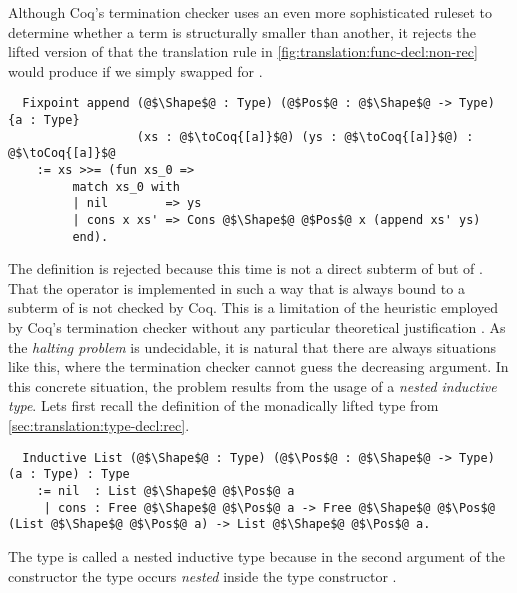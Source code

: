 Although Coq's termination checker uses an even more sophisticated ruleset to determine whether a term is structurally smaller than another, it rejects the lifted version of  that the translation rule in \autoref{fig:translation:func-decl:non-rec} would produce if we simply swapped  for .
\begin{verbatim}
  Fixpoint append (@$\Shape$@ : Type) (@$Pos$@ : @$\Shape$@ -> Type) {a : Type}
                  (xs : @$\toCoq{[a]}$@) (ys : @$\toCoq{[a]}$@) : @$\toCoq{[a]}$@
    := xs >>= (fun xs_0 =>
         match xs_0 with
         | nil        => ys
         | cons x xs' => Cons @$\Shape$@ @$Pos$@ x (append xs' ys)
         end).
\end{verbatim}
The definition is rejected because this time  is not a direct subterm of  but of .
That the \coq{>>=} operator is implemented in such a way that  is always bound to a subterm of  is not checked by Coq.
This is a limitation of the heuristic employed by Coq's termination checker without any particular theoretical justification \cite[p.~62]{Chlipala:2013}.
As the \textit{halting problem} is undecidable, it is natural that there are always situations like this, where the termination checker cannot guess the decreasing argument.
In this concrete situation, the problem results from the usage of a \textit{nested inductive type}.
Lets first recall the definition of the monadically lifted  type from \autoref{sec:translation:type-decl:rec}.
\begin{verbatim}
  Inductive List (@$\Shape$@ : Type) (@$\Pos$@ : @$\Shape$@ -> Type) (a : Type) : Type
    := nil  : List @$\Shape$@ @$\Pos$@ a
     | cons : Free @$\Shape$@ @$\Pos$@ a -> Free @$\Shape$@ @$\Pos$@ (List @$\Shape$@ @$\Pos$@ a) -> List @$\Shape$@ @$\Pos$@ a.
\end{verbatim}
The  type is called a nested inductive type because in the second argument of the  constructor the type  occurs \textit{nested} inside the type constructor  \cite[p.~29]{Dylus:2018}.

